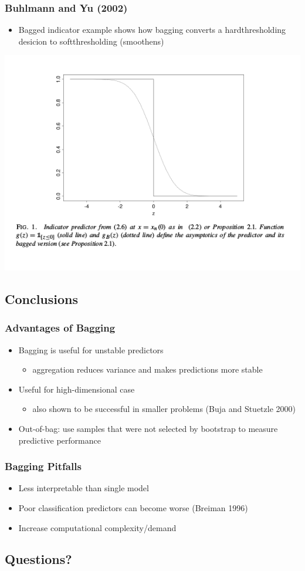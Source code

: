 \documentclass[bigger]{beamer}
\begin{document}
\begin{frame}
\frametitle{Buhlmann and Yu (2002)}
\label{sec-1-3-5}

\begin{itemize}
\item Bagged indicator example shows how bagging converts a
  hardthresholding desicion to softthresholding (smoothens)
\end{itemize}

\includegraphics[width=.9\linewidth]{./BuhlmannYuFig1.png}
\end{frame}
\subsection{Conclusions}
\label{sec-1-4}
\begin{frame}
\frametitle{Advantages of Bagging}
\label{sec-1-4-1}

\begin{itemize}
\item Bagging is useful for unstable predictors
\begin{itemize}
\item aggregation reduces variance and makes predictions more stable
\end{itemize}
\item Useful for high-dimensional case
\begin{itemize}
\item also shown to be successful in smaller problems (Buja and
    Stuetzle 2000)
\end{itemize}
\item Out-of-bag: use samples that were not selected by bootstrap to
   measure predictive performance
\end{itemize}
\end{frame}
\begin{frame}
\frametitle{Bagging Pitfalls}
\label{sec-1-4-2}

\begin{itemize}
\item Less interpretable than single model
\item Poor classification predictors can become worse (Breiman 1996)
\item Increase computational complexity/demand
\end{itemize}
 
\end{frame}
\subsection{Questions?}
\label{sec-1-5}
\end{document}
